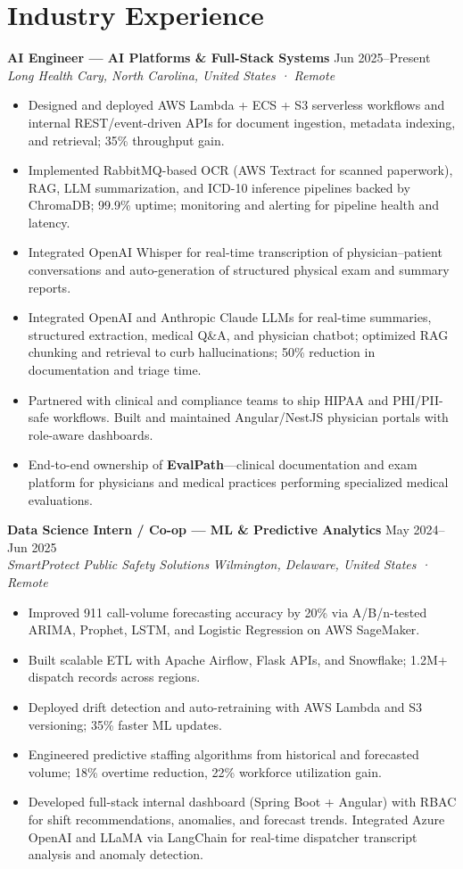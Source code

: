 \documentclass[11pt,a4paper]{article}
\newcommand{\cvEntry}[4]{\textbf{#1} \hfill #2 \\ \textit{#3} \hfill \textit{#4} \vspace{2pt}}
\newcommand{\cvItem}[1]{\item \small #1 \vspace{-1pt}}
\begin{document}
\section{Industry Experience}

\cvEntry{AI Engineer --- AI Platforms \& Full-Stack Systems}{Jun 2025--Present}{Long Health}{Cary, North Carolina, United States · Remote}
\begin{itemize}[leftmargin=*,nosep]
  \cvItem{Designed and deployed AWS Lambda + ECS + S3 serverless workflows and internal REST/event-driven APIs for document ingestion, metadata indexing, and retrieval; 35\% throughput gain.}
  \cvItem{Implemented RabbitMQ-based OCR (AWS Textract for scanned paperwork), RAG, LLM summarization, and ICD-10 inference pipelines backed by ChromaDB; 99.9\% uptime; monitoring and alerting for pipeline health and latency.}
  \cvItem{Integrated OpenAI Whisper for real-time transcription of physician--patient conversations and auto-generation of structured physical exam and summary reports.}
  \cvItem{Integrated OpenAI and Anthropic Claude LLMs for real-time summaries, structured extraction, medical Q\&A, and physician chatbot; optimized RAG chunking and retrieval to curb hallucinations; 50\% reduction in documentation and triage time.}
  \cvItem{Partnered with clinical and compliance teams to ship HIPAA and PHI/PII-safe workflows. Built and maintained Angular/NestJS physician portals with role-aware dashboards.}
  \cvItem{End-to-end ownership of \textbf{EvalPath}---clinical documentation and exam platform for physicians and medical practices performing specialized medical evaluations.}
\end{itemize}
\vspace{4pt}

\cvEntry{Data Science Intern / Co-op --- ML \& Predictive Analytics}{May 2024--Jun 2025}{SmartProtect Public Safety Solutions}{Wilmington, Delaware, United States · Remote}
\begin{itemize}[leftmargin=*,nosep]
  \cvItem{Improved 911 call-volume forecasting accuracy by 20\% via A/B/n-tested ARIMA, Prophet, LSTM, and Logistic Regression on AWS SageMaker.}
  \cvItem{Built scalable ETL with Apache Airflow, Flask APIs, and Snowflake; 1.2M+ dispatch records across regions.}
  \cvItem{Deployed drift detection and auto-retraining with AWS Lambda and S3 versioning; 35\% faster ML updates.}
  \cvItem{Engineered predictive staffing algorithms from historical and forecasted volume; 18\% overtime reduction, 22\% workforce utilization gain.}
  \cvItem{Developed full-stack internal dashboard (Spring Boot + Angular) with RBAC for shift recommendations, anomalies, and forecast trends. Integrated Azure OpenAI and LLaMA via LangChain for real-time dispatcher transcript analysis and anomaly detection.}
\end{itemize}
\vspace{4pt}
\end{document}
